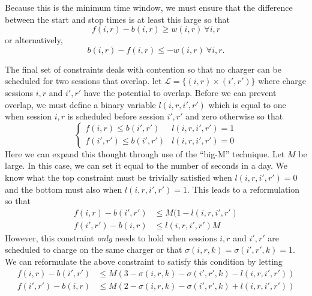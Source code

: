 \par Because this is the minimum time window, we must ensure that the difference between the start and stop times is at least this large so that
\begin{equation*}
	f(i,r) - b(i,r) \ge w(i,r) \ \forall i,r	
\end{equation*}
or alternatively,
\begin{equation}
	b(i,r) - f(i,r) \le -w(i,r) \ \forall i,r.
\end{equation}
\par The final set of constraints deals with contention so that no charger can be scheduled for two sessions that overlap. let $\mathcal{L} = \{(i,r)\times (i',r') \}$ where charge sessions $i,r$ and $i',r'$ have the potential to overlap. Before we can prevent overlap, we must define a binary variable $l(i,r,i',r')$ which is equal to one when session $i,r$ is scheduled before session $i',r'$ and zero otherwise so that
\begin{equation*}
	\begin{cases}
		f(i,r) \le b(i',r') & l(i,r,i',r') = 1 \\
		f(i',r') \le b(i',r') & l(i,r,i',r') = 0 
	\end{cases}
\end{equation*}
Here we can expand this thought through use of the ``big-M'' technique.  Let $M$ be large. In this case, we can set it equal to the number of seconds in a day. We know what the top constraint must be trivially satisfied when $l(i,r,i',r') = 0$ and the bottom must also when $l(i,r,i',r') = 1$.  This leads to a reformulation so that
\begin{equation*}\begin{aligned}
		f(i,r) - b(i',r') & \le M(1 - l(i,r,i',r')\\
		f(i',r') - b(i,r) & \le l(i,r,i',r')M  
\end{aligned}\end{equation*}
However, this constraint {\it only} needs to hold when sessions $i,r$ and $i',r'$ are scheduled to charge on the same charger or that $\sigma(i,r,k) = \sigma(i',r',k) = 1$. We can reformulate the above constraint to satisfy this condition by letting
\begin{equation}\begin{aligned}
	f(i,r) - b(i',r') & \le M(3 - \sigma(i,r,k) - \sigma(i',r',k) - l(i,r,i',r')) \\
	f(i',r') - b(i,r) & \le M(2 - \sigma(i,r,k) - \sigma(i',r',k) + l(i,r,i',r'))
\end{aligned}\end{equation}
